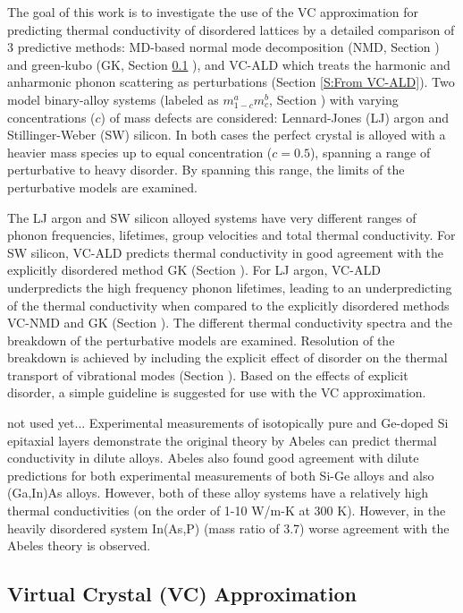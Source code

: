 \documentclass[aps,prb,twocolumn,superscriptaddress,amsmath,amssymb,floatfix]{revtex4}
\begin{document}
The goal of this work is to investigate the use of the VC 
approximation for predicting thermal conductivity of disordered 
lattices by a detailed comparison 
of 3 predictive methods: MD-based normal mode 
decomposition (NMD, Section ) and green-kubo (GK, Section \ref{} ), 
and VC-ALD which treats the harmonic and 
anharmonic phonon scattering as perturbations 
(Section \ref{S:From VC-ALD}).  
Two model binary-alloy systems 
(labeled as $m^a_{1-c}m^b_{c}$, Section ) 
with varying concentrations ($c$) of mass defects  
are considered: 
Lennard-Jones (LJ) argon and Stillinger-Weber (SW) silicon. 
In both cases the perfect crystal is 
alloyed with a heavier mass species up to equal 
concentration ($c=0.5$), spanning 
a range of perturbative to heavy disorder. By spanning this range, 
the limits of the perturbative models are examined.

The LJ argon and SW silicon alloyed 
systems have very different ranges of phonon frequencies, 
lifetimes, group velocities and total thermal conductivity. 
For SW silicon, 
VC-ALD predicts thermal conductivity in good agreement with the 
explicitly disordered method GK (Section ). 
For LJ argon, VC-ALD underpredicts 
the high frequency phonon lifetimes, leading to an underpredicting of 
the thermal conductivity when compared to the explicitly disordered 
methods VC-NMD and GK (Section ). 
The different thermal conductivity spectra  
and the breakdown of the perturbative models are examined. Resolution 
of the breakdown is achieved by including the explicit effect of
disorder on the thermal transport of vibrational modes (Section ). Based 
on the effects of explicit disorder, a simple guideline is suggested 
for use with the VC approximation.

not used yet...
Experimental measurements of isotopically pure and Ge-doped 
Si epitaxial layers demonstrate the original theory by Abeles can predict 
thermal conductivity in dilute alloys. Abeles also found good agreement 
with dilute predictions for both experimental measurements of both 
Si-Ge alloys and also (Ga,In)As alloys.\cite{abeles_lattice_1963} However, 
both of these alloy systems have a relatively high thermal conductivities 
(on the order of 1-10 W/m-K at 300 K). However, in the heavily disordered 
system In(As,P) (mass ratio of 3.7) worse agreement with the Abeles theory 
is observed. 

\subsection{\label{S:Virtual Crystal}Virtual Crystal (VC) Approximation}
\end{document}
